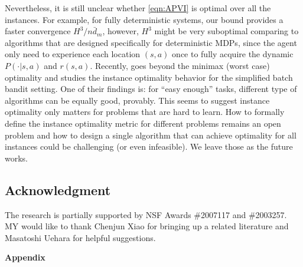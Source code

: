 \documentclass[11pt]{article}
\begin{document}
Nevertheless, it is still unclear whether \eqref{eqn:APVI} is optimal over all the instances. For example, for fully deterministic systems, our bound provides a faster convergence $H^3/n\bar{d}_m$, however, $H^3$ might be very suboptimal comparing to algorithms that are designed specifically for deterministic MDPs, since the agent only need to experience each location $(s,a)$ once to fully acquire the dynamic $P(\cdot|s,a)$ and $r(s,a)$. Recently, \cite{xiao2021optimality} goes beyond the minimax (worst case) optimality and studies the instance optimality behavior for the simplified batch bandit setting. One of their findings is: for ``easy enough'' tasks, different type of algorithms can be equally good, provably. This seems to suggest instance optimality only matters for problems that are hard to learn. How to formally define the instance optimality metric for different problems remains an open problem and how to design a single algorithm that can achieve optimality for all instances could be challenging (or even infeasible). We leave those as the future works.








\subsection*{Acknowledgment}
The research is partially supported by NSF Awards \#2007117 and \#2003257. MY would like to thank Chenjun Xiao for bringing up a related literature \citep{xiao2021optimality} and Masatoshi Uehara for helpful suggestions.




\appendix

\clearpage
\begin{center}
	 {\LARGE \textbf{Appendix}}
\end{center}



\end{document}
